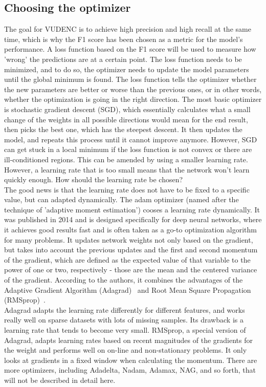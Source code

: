 \documentclass[
	a4paper,
	pagesize,
	pdftex,
	12pt,
	twoside, %
	BCOR=5mm, %
	ngerman,
	fleqn,
	final,
	]{scrartcl}
\begin{document}
\subsection{Choosing the optimizer}\label{optimizer}
The goal for VUDENC is to achieve high precision and high recall at the same time, which is why the F1 score has been chosen as a metric for the model's performance. A loss function based on the F1 score will be used to measure how 'wrong' the predictions are at a certain point. The loss function needs to be minimized, and to do so, the optimizer needs to update the model parameters until the global minimum is found. The loss function tells the optimizer whether the new parameters are better or worse than the previous ones, or in other words, whether the optimization is going in the right direction. The most basic optimizer is stochastic gradient descent (SGD), which essentially calculates what a small change of the weights in all possible directions would mean for the end result, then picks the best one, which has the steepest descent. It then updates the model, and repeats this process until it cannot improve anymore. However, SGD can get stuck in a local minimum if the loss function is not convex or there are ill-conditioned regions. This can be amended by using a smaller learning rate. However, a learning rate that is too small means that the network won't learn quickly enough. How should the learning rate be chosen?\\
The good news is that the learning rate does not have to be fixed to a specific value, but can adapted dynamically. The adam optimizer (named after the technique of 'adaptive moment estimation') cooses a learning rate dynamically. It was published in 2014 \cite{Kingma.2014} and is designed specifically for deep neural networks, where it achieves good results fast and is often taken as a go-to optimization algorithm for many problems. It updates network weights not only based on the gradient, but takes into account the previous updates and the first and second momentum of the gradient, which are defined as the expected value of that variable to the power of one or two, respectively - those are the mean and the centered variance of the gradient. According to the authors, it combines the advantages of the Adaptive Gradient Algorithm (Adagrad)~\cite{Duchi.2011} and Root Mean Square Propagation (RMSprop)~\cite{Tieleman.2012}.\\
Adagrad adapts the learning rate differently for different features, and works really well on sparse datasets with lots of missing samples. Its drawback is a learning rate that tends to become very small. RMSprop, a special version of Adagrad, adapts learning rates based on recent magnitudes of the gradients for the weight and performs well on on-line and non-stationary problems. It only looks at gradients in a fixed window when calculating the momentum. There are more optimizers, including Adadelta, Nadam, Adamax, NAG, and so forth, that will not be described in detail here.\\
\end{document}
